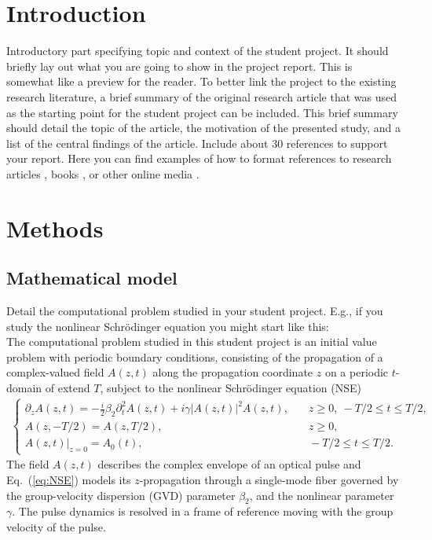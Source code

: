 
\section{Introduction}

Introductory part specifying topic and context of the student project. It
should briefly lay out what you are going to show in the project report. This
is somewhat like a preview for the reader. 
To better link the project to the existing research literature, a brief summary
of the original research article that was used as the starting point for the
student project can be included.
This brief summary should detail the topic of the article, the motivation of the
presented study, and a list of the central findings of the article. 
Include about 30 references to support your report. Here you can find examples
of how to format references to research articles \cite{Akhmediev:PRA:1995},
books \cite{Drazin:book:1989}, or other online media \cite{Scipy}.

\section{Methods}

\subsection{Mathematical model}
Detail the computational problem studied in your student project. E.g., if 
you study the nonlinear Schr\"odinger equation you might start like this:\\

\noindent The computational problem studied in this student project is an initial
value problem with periodic boundary conditions, consisting of the propagation
of a complex-valued field $A(z,t)$ along the propagation coordinate $z$ on a
periodic $t$-domain of extend $T$, subject to the nonlinear Schr\"odinger equation (NSE) 
\begin{align}
\begin{cases}
\partial_z A(z,t) =-\frac{i}{2}\beta_2 \partial_t^2 A(z,t) + i\gamma |A(z,t)|^2 A(z,t) , & \quad z\geq0,~-T/2\leq t\leq T/2,\label{eq:NSE}\\
A(z,-T/2)=A(z,T/2), &\quad z\geq 0,\\
A(z,t)|_{z=0} = A_0(t), &\quad -T/2\leq t \leq T/2.
\end{cases}
\end{align}
The field $A(z,t)$ describes the complex envelope of an optical pulse and
Eq.~(\ref{eq:NSE}) models its $z$-propagation 
through a single-mode fiber governed by the group-velocity
dispersion (GVD) parameter $\beta_2$, and the nonlinear parameter $\gamma$.
The pulse dynamics is resolved in a frame of reference moving with the
group velocity of the pulse.

